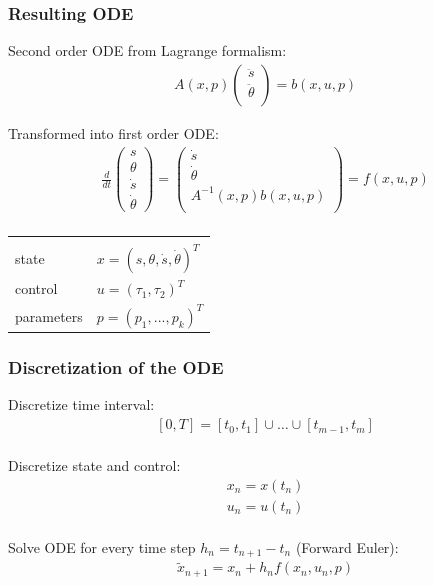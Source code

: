 \documentclass{beamer}
\begin{document}
\begin{frame}[c]
	\frametitle{Resulting ODE}
	
	Second order ODE from Lagrange formalism:
	\begin{align*}
	  &A(x,p)
	  \begin{pmatrix} 
	    \ddot{s} \\ \ddot{\theta} \\
	  \end{pmatrix}
	  = b(x,u,p)
	\end{align*}
	
	Transformed into first order ODE:
	\begin{align*}
	  &\frac{d}{dt}
	  \begin{pmatrix}
	  s \\ \theta \\ \dot{s} \\ \dot{\theta}
	  \end{pmatrix}
	  =
	  \begin{pmatrix}
	    \dot{s} \\ \dot{\theta} \\ A^{-1}(x,p)b(x,u,p) \\
	  \end{pmatrix} 
	  = f(x,u,p) \\
	\end{align*}
	
	\vspace{-1.0cm}
	
	\begin{tabular}{ll}
	  & \\
	  state & $ x = (s,\theta,\dot{s},\dot{\theta})^T $ \\
	  control & $ u = (\tau_1,\tau_2)^T $ \\
	  parameters & $ p = (p_1,...,p_k)^T $ \\
	\end{tabular}
\end{frame}

\begin{frame}
	\frametitle{Discretization of the ODE}
	
	Discretize time interval:
	\begin{align*}
	  &[0,T] = [t_0,t_1] \cup \ldots \cup [t_{m-1},t_m] \\
	\end{align*}
	
	Discretize state and control:
	\begin{align*}
	  &x_n = x(t_n) \\
	  &u_n = u(t_n) \\
	\end{align*}
	
	Solve ODE for every time step $h_n=t_{n+1}-t_n$ (Forward Euler):
	\begin{align*}
	  &\tilde{x}_{n+1} = x_n + h_n f(x_n,u_n,p) \\
	\end{align*}
\end{frame}
\end{document}
